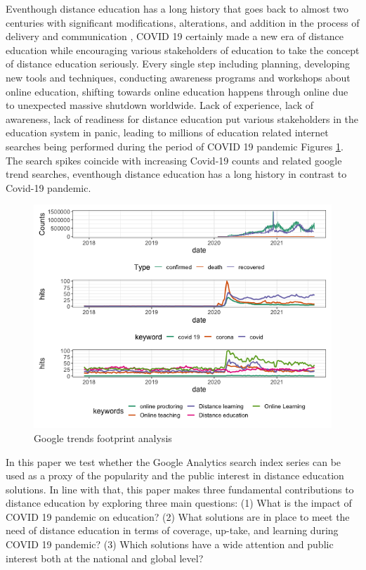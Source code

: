 \documentclass[11pt,a4paper,]{article}
\begin{document}
Eventhough distance education has a long history that goes back to almost two centuries \autocite{spector2014handbook} with significant modifications,
alterations, and addition in the process of delivery and communication \autocite{moore2011learning}, COVID 19 certainly made a new era of distance education while encouraging various stakeholders of education to take the concept of distance education seriously. Every single step including planning, developing new tools and techniques, conducting awareness programs and workshops about online education, shifting towards online education happens through online due to unexpected massive shutdown worldwide. Lack of experience, lack of awareness, lack of readiness for distance education put various stakeholders in the education system in panic, leading to millions of education related internet searches being performed during the period of COVID 19 pandemic Figures \ref{fig:distanceLearningWorldAnalysis}. The search spikes coincide with increasing Covid-19 counts and related google trend searches, eventhough distance education has a long history in contrast to Covid-19 pandemic.

\begin{figure}[h]

{\centering \includegraphics[width=1\textwidth]{figure/distanceLearningWorldAnalysis-1} 

}

\caption{Google trends footprint analysis}\label{fig:distanceLearningWorldAnalysis}
\end{figure}

In this paper we test whether the Google Analytics search index series can be used as a proxy of the popularity and the public interest in distance education solutions. In line with that, this paper makes three fundamental contributions to distance education by exploring three main questions: (1) What is the impact of COVID 19 pandemic on education? (2) What solutions are in place to meet the need of distance education in terms of coverage, up-take, and learning during COVID 19 pandemic? (3) Which solutions have a wide attention and public interest both at the national and global level?
\end{document}
